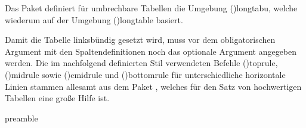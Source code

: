 \documentclass[%
  english,ngerman,%
  cdgeometry=no,DIV=12,%
  cd=false,cdfont=false,cdtitle=true,%
  headings=normal,%
  automark,%
  listof=toc,%
]{tudscrartcl}
\begin{document}

Das Paket  definiert für umbrechbare Tabellen die Umgebung 
\Environment(){longtabu}, welche wiederum auf der Umgebung 
\Environment(){longtable} basiert.

Damit die Tabelle linksbündig gesetzt wird, muss vor dem obligatorischen 
Argument mit den Spaltendefinitionen noch das optionale Argument  
angegeben werden. Die im nachfolgend definierten Stil verwendeten Befehle 
\Macro(){toprule}, \Macro(){midrule} sowie
\Macro(){cmidrule} und \Macro(){bottomrule} 
für unterschiedliche horizontale Linien stammen allesamt aus dem Paket 
, welches für den Satz von hochwertigen Tabellen eine große 
Hilfe ist.
%
\CodeHook{\let\newglossarystyle\renewglossarystyle}
\begin{Code}[input]{preamble}
\end{Code}
\begin{Code}[nolst]{preamble}
}%

\end{Code}
\end{document}
